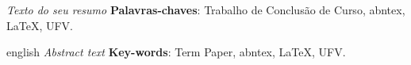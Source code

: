 \documentclass[
	12pt, %
	openright, %
	oneside, %
	a4paper, %
  sumario=tradicional, %
	english, %
	brazil, %
]{abntex2} %
\begin{document}
\frenchspacing
\pretextual

\imprimircapa

\imprimirfolhaderosto


%

%

%


\begin{resumo}
  \noindent
  \textit{Texto do seu resumo} %
  \vspace{\onelineskip}
  \noindent
  \textbf{Palavras-chaves}: Trabalho de Conclusão de Curso, abntex, LaTeX, UFV.
\end{resumo}

\begin{resumo}[Abstract]
  \begin{otherlanguage*}{english}
    \noindent
    \textit{Abstract text} %
    \vspace{\onelineskip}
    \noindent
    \textbf{Key-words}: Term Paper, abntex, LaTeX, UFV.
  \end{otherlanguage*}
\end{resumo}
\end{document}
